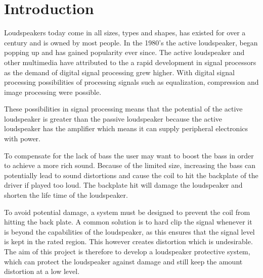 \chapter{Introduction}
Loudspeakers today come in all sizes, types and shapes, has existed for over a century and is owned by most people. In the 1980's the active loudspeaker, began popping up and has gained popularity ever since. The active loudspeaker and other multimedia have attributed to the a rapid development in signal processors as the demand of digital signal processing grew higher. With digital signal processing possibilities of processing signals such as equalization, compression and image processing were possible.

These possibilities in signal processing means that the potential of the active loudspeaker is greater than the passive loudspeaker because the active loudspeaker has the amplifier which means it can supply peripheral electronics with power.


To compensate for the lack of bass the user may want to boost the bass in order to achieve a more rich sound. Because of the limited size, increasing the bass can potentially lead to sound distortions and cause the coil to hit the backplate of the driver if played too loud. The backplate hit will damage the loudspeaker and shorten the life time of the loudspeaker.

To avoid potential damage, a system must be designed to prevent the coil from hitting the back plate. A common solution is to hard clip the signal whenever it is beyond the capabilities of the loudspeaker, as this ensures that the signal level is kept in the rated region. This however creates distortion which is undesirable. The aim of this project is therefore to develop a loudspeaker protective system, which can protect the loudspeaker against damage and still keep the amount distortion at a low level.




